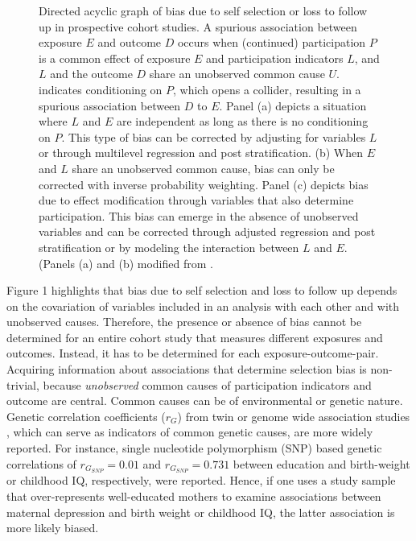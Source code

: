 \documentclass[]{article}
\newcommand*\circled[1]{\tikz[baseline=(char.base)]{
		\node[shape=circle,draw,inner sep=2pt] (char) {#1};}}
\begin{document}
\begin{figure}
	\centering
	 
	\caption{Directed acyclic graph of bias due to self selection or loss to follow up in prospective cohort studies. A spurious association between exposure $E$ and outcome $D$ occurs when (continued) participation $P$ is a common effect of exposure $E$ and participation indicators $L$, and $L$ and the outcome $D$ share an unobserved common cause $U$. \protect\circled{$P$} indicates conditioning on $P$, which opens a collider\supercite{Cole2010-za}, resulting in a spurious association between $D$ to $E$. Panel (a) depicts a situation where $L$ and $E$ are independent as long as there is no conditioning on $P$. This type of bias can be corrected by adjusting for variables $L$ or through multilevel regression and post stratification. (b) When $E$ and $L$ share an unobserved common cause, bias can only be corrected with inverse probability weighting. Panel (c) depicts bias due to effect modification through variables that also determine participation. This bias can emerge in the absence of unobserved variables and can be corrected through adjusted regression and post stratification or by modeling the interaction between $L$ and $E$. (Panels (a) and (b) modified from \citeauthor{Hernan2004-oz}\supercite{Hernan2004-oz}.}
	\label{fig:SelectionBias}
\end{figure}


Figure 1 highlights that bias due to self selection and loss to follow up depends on the covariation of variables included in an analysis with each other and with unobserved causes. Therefore, the presence or absence of bias cannot be determined for an entire cohort study that measures different exposures and outcomes. Instead, it has to be determined for each exposure-outcome-pair. Acquiring information about associations that determine selection bias is non-trivial, because \emph{unobserved} common causes of participation indicators and outcome are central. Common causes can be of environmental\supercite{Johnson2011-wi,Verweij2013-xk} or genetic nature. Genetic correlation coefficients ($r_G$) from twin\supercite{Tambs2012-km} or genome wide association studies \supercite{Bulik-Sullivan2015-er}, which can serve as indicators of common genetic causes, are more widely reported. For instance, single nucleotide polymorphism (SNP) based genetic correlations of $r_{G_{SNP}}=0.01$ and $r_{G_{SNP}}=0.731$ between education and birth-weight or childhood IQ, respectively, were reported\supercite{Bulik-Sullivan2015-xn}. Hence, if one uses a study sample that over-represents well-educated mothers to examine associations between maternal depression and birth weight or childhood IQ, the latter association is more likely biased.
\end{document}
